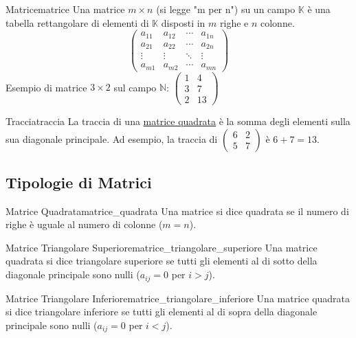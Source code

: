 \documentclass{article}
\begin{document}
\begin{definition}{Matrice}{matrice}
    Una matrice $m \times n$ (si legge "m per n") su un campo $\mathbb{K}$ è una tabella rettangolare di elementi di $\mathbb{K}$ disposti in $m$ righe e $n$ colonne.
    \[ \begin{pmatrix}
    a_{11} & a_{12} & \cdots & a_{1n} \\
    a_{21} & a_{22} & \cdots & a_{2n} \\
    \vdots & \vdots & \ddots & \vdots \\
    a_{m1} & a_{m2} & \cdots & a_{mn}
    \end{pmatrix} \]
    Esempio di matrice $3 \times 2$ sul campo $\mathbb{N}$: $\begin{pmatrix} 1 & 4 \\ 3 & 7 \\ 2 & 13 \end{pmatrix}$
\end{definition}

\begin{definition}{Traccia}{traccia}
    La traccia di una \hyperref[def:matrice_quadrata]{matrice quadrata} è la somma degli elementi sulla sua diagonale principale.
    Ad esempio, la traccia di $\begin{pmatrix} 6 & 2 \\ 5 & 7 \end{pmatrix}$ è $6+7=13$.
\end{definition}

\subsection{Tipologie di Matrici}

\begin{definition}{Matrice Quadrata}{matrice_quadrata}
Una matrice si dice quadrata se il numero di righe è uguale al numero di colonne ($m=n$).
\end{definition}

\begin{definition}{Matrice Triangolare Superiore}{matrice_triangolare_superiore}
Una matrice quadrata si dice triangolare superiore se tutti gli elementi al di sotto della diagonale principale sono nulli ($a_{ij} = 0$ per $i>j$).
\end{definition}

\begin{definition}{Matrice Triangolare Inferiore}{matrice_triangolare_inferiore}
Una matrice quadrata si dice triangolare inferiore se tutti gli elementi al di sopra della diagonale principale sono nulli ($a_{ij} = 0$ per $i<j$).
\end{definition}
\end{document}
